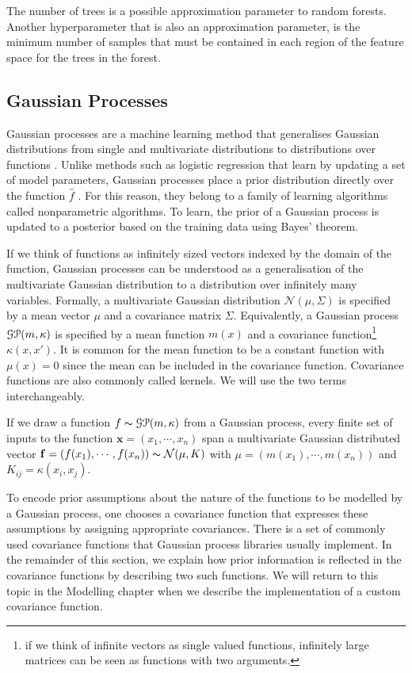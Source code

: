 \documentclass[a4paper,12pt,twoside,openright]{report}
\begin{document}
The number of trees is a possible approximation parameter to random forests. Another hyperparameter that is also an approximation parameter, is the minimum number of samples that must be contained in each region of the feature space for the trees in the forest.

\subsection{Gaussian Processes}
Gaussian processes are a machine learning method that generalises Gaussian distributions from single and multivariate distributions to distributions over functions \cite{Rasmussen:2005:GPM:1162254}. Unlike methods such as logistic regression that learn by updating a set of model parameters, Gaussian processes place a prior distribution directly over the function $\hat{f}$ \cite{Murphy:2012:MLP:2380985}. For this reason, they belong to a family of learning algorithms called nonparametric algorithms. To learn, the prior of a Gaussian process is updated to a posterior based on the training data using Bayes' theorem.

If we think of functions as infinitely sized vectors indexed by the domain of the function, Gaussian processes can be understood as a generalisation of the multivariate Gaussian distribution to a distribution over infinitely many variables. Formally, a multivariate Gaussian distribution $\mathcal{N}(\mu, \Sigma)$ is specified by a mean vector $\mu$ and a covariance matrix $\Sigma$. Equivalently, a Gaussian process $\EuScript{G}\EuScript{P}(m, \kappa)$ is specified by a mean function $m(x)$ and a covariance function\footnote{if we think of infinite vectors as single valued functions, infinitely large matrices can be seen as functions with two arguments.} $\kappa(x, x')$. It is common for the mean function to be a constant function with $\mu(x) = 0$ since the mean can be included in the covariance function. Covariance functions are also commonly called kernels. We will use the two terms interchangeably.

If we draw a function $f \thicksim \EuScript{G}\EuScript{P}(m, \kappa)$ from a Gaussian process, every finite set of inputs to the function $\mathbf{x} = (x_1, \cdots, x_n)$ span a multivariate Gaussian distributed vector $\mathbf{f} = (f(x_1), \cdots, f(x_n)) \thicksim \mathcal{N}(\mu,K)$ with $\mu = (m(x_1), \cdots, m(x_n))$ and $K_{ij} = \kappa(x_i, x_j)$.

To encode prior assumptions about the nature of the functions to be modelled by a Gaussian process, one chooses a covariance function that expresses these assumptions by assigning appropriate covariances. There is a set of commonly used covariance functions that Gaussian process libraries usually implement. In the remainder of this section, we explain how prior information is reflected in the covariance functions by describing two such functions. We will return to this topic in the Modelling chapter when we describe the implementation of a custom covariance function. 
\end{document}
